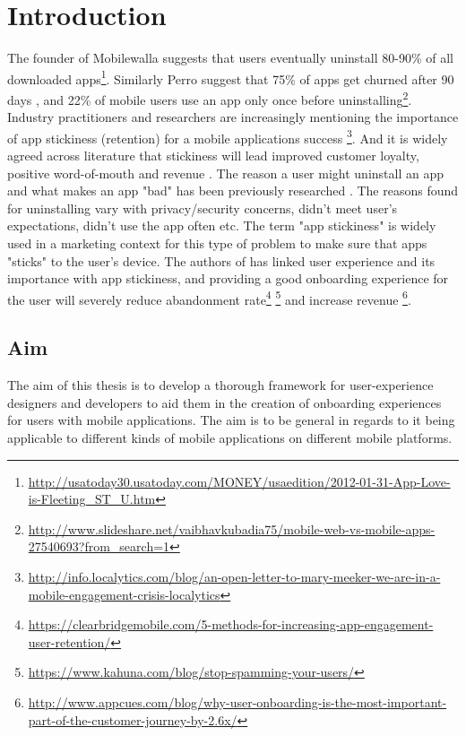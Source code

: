\chapter{Introduction}
\label{chap:introduction}
The founder of Mobilewalla suggests that users eventually uninstall 80-90\% of all downloaded apps\footnote{\url{http://usatoday30.usatoday.com/MONEY/usaedition/2012-01-31-App-Love-is-Fleeting\_ST\_U.htm}}. Similarly Perro suggest that 75\% of apps get churned after 90 days \cite{Perro2016}, and 22\% of mobile users use an app only once before uninstalling\footnote{\url{http://www.slideshare.net/vaibhavkubadia75/mobile-web-vs-mobile-apps-27540693?from_search=1}}. Industry practitioners and researchers are increasingly mentioning the importance of app stickiness (retention) for a mobile applications success \cite{Perro2016} \cite{IGIGlobal2016} \cite{Kim2016}\footnote{\url{http://info.localytics.com/blog/an-open-letter-to-mary-meeker-we-are-in-a-mobile-engagement-crisis-localytics}}. And it is widely agreed across literature that stickiness will lead improved customer loyalty, positive word-of-mouth and revenue \cite{Reichheld2000} \cite{Srinivasan2002} \cite{Hsu2016a}.
%
The reason a user might uninstall an app and what makes an app "bad" has been previously researched \cite{Lin2012} \cite{Shklovski} \cite{Song2014}. The reasons found for uninstalling vary with privacy/security concerns, didn't meet user's expectations, didn't use the app often etc. The term "app stickiness" is widely used in a marketing context for this type of problem to make sure that apps "sticks" to the user's device. The authors of \cite{IGIGlobal2016} has linked user experience and its importance with app stickiness, and providing a good onboarding experience for the user will severely reduce abandonment rate\footnote{\url{https://clearbridgemobile.com/5-methods-for-increasing-app-engagement-user-retention/}} \footnote{\url{https://www.kahuna.com/blog/stop-spamming-your-users/}} and increase revenue \footnote{\url{http://www.appcues.com/blog/why-user-onboarding-is-the-most-important-part-of-the-customer-journey-by-2.6x/}}.

\section{Aim}
The aim of this thesis is to develop a thorough framework for user-experience designers and developers to aid them in the creation of onboarding experiences for users with mobile applications. The aim is to be general in regards to it being applicable to different kinds of mobile applications on different mobile platforms.

